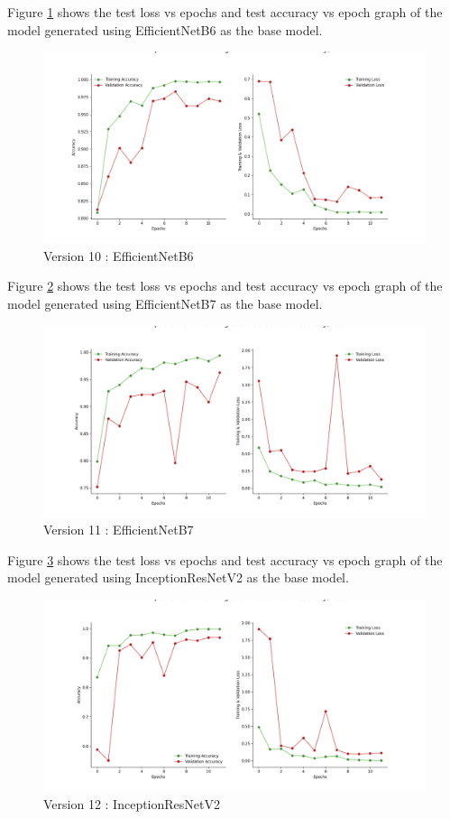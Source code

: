 Figure \ref{fig:effnetb6} shows the test loss vs epochs and test accuracy vs epoch graph of the model generated using EfficientNetB6 as the base model.
\begin{figure}[H]
\includegraphics[scale=0.29]{Photos/EfficientNetB6_plot.png}
\caption{Version 10 : EfficientNetB6} \label{fig:effnetb6}
\end{figure}
Figure \ref{fig:effnetb7} shows the test loss vs epochs and test accuracy vs epoch graph of the model generated using EfficientNetB7 as the base model.
\begin{figure}[H]
\includegraphics[scale=0.29]{Photos/EfficientNetB7_plot.png}
\caption{Version 11 : EfficientNetB7} \label{fig:effnetb7}
\end{figure}
Figure \ref{fig:inceptionresv2} shows the test loss vs epochs and test accuracy vs epoch graph of the model generated using InceptionResNetV2 as the base model.
\begin{figure}[H]
\includegraphics[scale=0.29]{Photos/InceptionResNetV2_plot.png}
\caption{Version 12 : InceptionResNetV2} \label{fig:inceptionresv2}
\end{figure}
